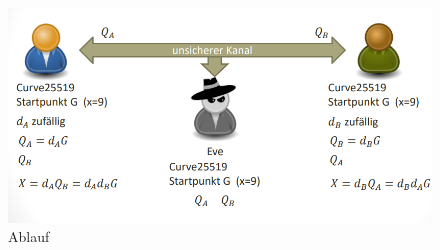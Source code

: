 \begin{figure}[H]
	\begin{center}
		\includegraphics[scale=0.6]{Resources/EC4}
		\caption{Ablauf}
		\label{fig:EC4}
	\end{center}
\end{figure}




















